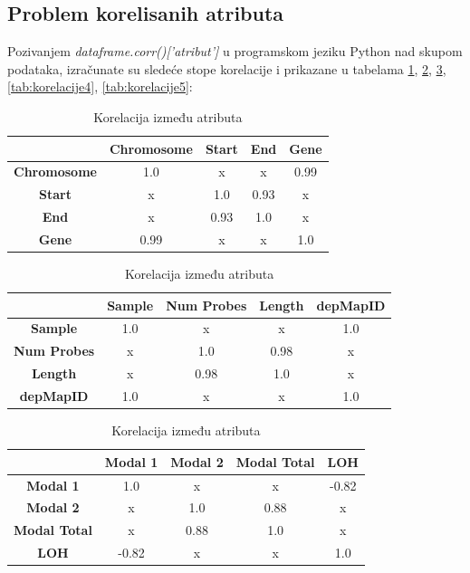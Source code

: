 \documentclass[a4paper]{article}
\begin{document}
\subsection{Problem korelisanih atributa}
\label{subsec:korelacija}

Pozivanjem \textit{dataframe.corr()['atribut']} u programskom jeziku Python nad skupom podataka, izračunate su sledeće stope korelacije i prikazane u tabelama \ref{tab:korelacije1}, \ref{tab:korelacije2}, \ref{tab:korelacije3}, \ref{tab:korelacije4}, \ref{tab:korelacije5}:

\begin{table}[ht!]
\begin{center}
\caption{Korelacija između atributa}
\label{tab:korelacije1}
\begin{tabular}{c|c|c|c|c} \hline
& \textbf{Chromosome} & \textbf{Start} & \textbf{End} & \textbf{Gene}\\ \hline
\textbf{Chromosome} & 1.0 & x & x & 0.99 \\ \hline
\textbf{Start} & x & 1.0 & 0.93 & x\\ \hline
\textbf{End} & x & 0.93 & 1.0 & x\\ \hline
\textbf{Gene} & 0.99 & x & x & 1.0\\ \hline
\end{tabular}
\end{center}
\end{table}

\begin{table}[ht!]
\begin{center}
\caption{Korelacija između atributa}
\label{tab:korelacije2}
\begin{tabular}{c|c|c|c|c} \hline
& \textbf{Sample} & \textbf{Num Probes} & \textbf{Length} & \textbf{depMapID}\\ \hline
\textbf{Sample} & 1.0 & x & x & 1.0 \\ \hline
\textbf{Num Probes} & x & 1.0 & 0.98 & x \\ \hline
\textbf{Length} & x & 0.98 & 1.0 & x\\ \hline
\textbf{depMapID} & 1.0 & x & x & 1.0 \\ \hline
\end{tabular}
\end{center}
\end{table}

\begin{table}[ht!]
\begin{center}
\caption{Korelacija između atributa}
\label{tab:korelacije3}
\begin{tabular}{c|c|c|c|c} \hline
& \textbf{Modal 1} & \textbf{Modal 2} & \textbf{Modal Total} & \textbf{LOH}\\ \hline
\textbf{Modal 1} & 1.0 & x & x & -0.82\\ \hline
\textbf{Modal 2} & x & 1.0 & 0.88 & x\\ \hline
\textbf{Modal Total} & x & 0.88 & 1.0 & x\\ \hline
\textbf{LOH} & -0.82 & x & x & 1.0\\ \hline
\end{tabular}
\end{center}
\end{table}
\end{document}
